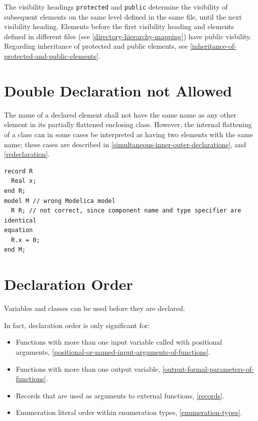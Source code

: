 The visibility headings \lstinline!protected! and \lstinline!public! determine the visibility of subsequent elements on the same level defined in the same file, until the next visibility heading.
Elements before the first visibility heading and elements defined in different files (see \cref{directory-hierarchy-mapping}) have public visbility.
Regarding inheritance of protected and public elements, see \cref{inheritance-of-protected-and-public-elements}.


\section{Double Declaration not Allowed}\label{double-declaration-not-allowed}

The name of a declared element shall not have the same name as any other element in its partially flattened enclosing class.
However, the internal flattening of a class can in some cases be interpreted as having two elements with the same name; these cases are described in \cref{simultaneous-inner-outer-declarations}, and \cref{redeclaration}.

\begin{example}
\begin{lstlisting}[language=modelica]
record R
  Real x;
end R;
model M // wrong Modelica model
  R R; // not correct, since component name and type specifier are identical
equation
  R.x = 0;
end M;
\end{lstlisting}
\end{example}

\section{Declaration Order}\label{declaration-order}\label{declaration-order-and-usage-before-declaration}

Variables and classes can be used before they are declared.

\begin{nonnormative}
In fact, declaration order is only significant for:
\begin{itemize}
\item
  Functions with more than one input variable called with positional arguments, \cref{positional-or-named-input-arguments-of-functions}.
\item
  Functions with more than one output variable, \cref{output-formal-parameters-of-functions}.
\item
  Records that are used as arguments to external functions, \cref{records}.
\item
  Enumeration literal order within enumeration types, \cref{enumeration-types}.
\end{itemize}
\end{nonnormative}

